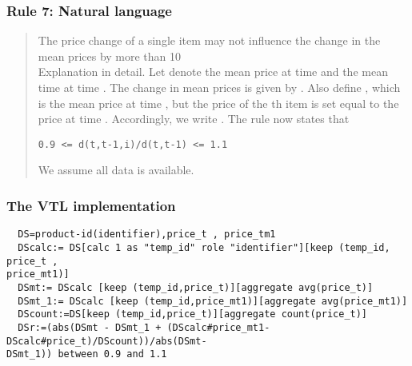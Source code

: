 \newpage

\subsubsection*{  Rule 7: Natural language}
\begin{quote}


The price change of a single item may not influence the change in the mean prices by more than 10\\%

Explanation in detail. Let  denote the mean price at time  and  the mean time at time .
The change in mean prices is given by . Also define , which is the
mean price at time , but the price of the th item is set equal to the price at time . Accordingly, we write . The rule now states that
\begin{verbatim}
0.9 <= d(t,t-1,i)/d(t,t-1) <= 1.1
\end{verbatim}

We assume all data is available.


\end{quote}
\subsubsection*{The VTL implementation}
\begin{verbatim}
  DS=product-id(identifier),price_t , price_tm1
  DScalc:= DS[calc 1 as "temp_id" role "identifier"][keep (temp_id, price_t ,
price_mt1)]
  DSmt:= DScalc [keep (temp_id,price_t)][aggregate avg(price_t)]
  DSmt_1:= DScalc [keep (temp_id,price_mt1)][aggregate avg(price_mt1)]
  DScount:=DS[keep (temp_id,price_t)][aggregate count(price_t)]
  DSr:=(abs(DSmt - DSmt_1 + (DScalc#price_mt1- DScalc#price_t)/DScount))/abs(DSmt-
DSmt_1)) between 0.9 and 1.1
\end{verbatim}
